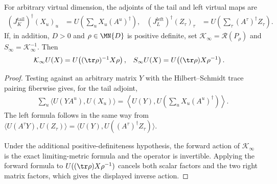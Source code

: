 \begin{lemma}%
    \label{thm:limiting_metric_inverse_virtual_adjoints}
    \leanok
    For arbitrary virtual dimension, the adjoints of the tail and left virtual
    maps are
    \begin{align}
        (J^{\mathrm{tail}}_K)^\dagger(X_u)_u
         & =U\!\left(\sum_u X_u(A^u)^\dagger\right),          &
        (J^{\mathrm{left}}_L)^\dagger(Z_\tau)_\tau
         & =U\!\left(\sum_\tau(A^\tau)^\dagger Z_\tau\right).
    \end{align}
    If, in addition, $D>0$ and $\rho\in\MN{D}$ is positive definite, set
    $\mathcal K_\infty=\mathscr R(P_\rho)$ and
    $S_\infty=\mathcal K_\infty^{-1}$.  Then
    \begin{align}
        \mathcal K_\infty U(X)
         & =U\!\left((\tr\rho)^{-1}X\rho\right), &
        S_\infty U(X)
         & =U\!\left((\tr\rho)X\rho^{-1}\right).
    \end{align}
\end{lemma}
\begin{proof}
    \leanok
    Testing against an arbitrary matrix $Y$ with the Hilbert--Schmidt trace
    pairing fiberwise gives, for the tail adjoint,
    \begin{align}
        \sum_u\langle U(YA^u),U(X_u)\rangle
        =\left\langle U(Y),
        U\!\left(\sum_uX_u(A^u)^\dagger\right)\right\rangle.
    \end{align}
    The left formula follows in the same way from
    $\langle U(A^\tau Y),U(Z_\tau)\rangle
        =\langle U(Y),U((A^\tau)^\dagger Z_\tau)\rangle$.

    Under the additional positive-definiteness hypothesis, the forward action
    of $\mathcal K_\infty$ is the exact limiting-metric formula and the
    operator is invertible.  Applying the forward formula to
    $U((\tr\rho)X\rho^{-1})$ cancels both scalar factors and the two right
    matrix factors, which gives the displayed inverse action.
\end{proof}

